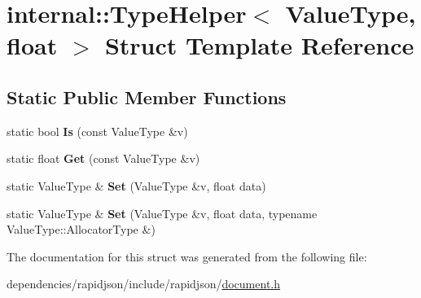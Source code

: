 \hypertarget{structinternal_1_1_type_helper_3_01_value_type_00_01float_01_4}{}\section{internal\+:\+:Type\+Helper$<$ Value\+Type, float $>$ Struct Template Reference}
\label{structinternal_1_1_type_helper_3_01_value_type_00_01float_01_4}
\subsection*{Static Public Member Functions}
\begin{DoxyCompactItemize}
\item 
\mbox{\label{structinternal_1_1_type_helper_3_01_value_type_00_01float_01_4_a1108488a02868bb91c3c14f4598bbebc}} 
static bool {\bfseries Is} (const Value\+Type \&v)
\item 
\mbox{\label{structinternal_1_1_type_helper_3_01_value_type_00_01float_01_4_aa681e0d25878a7a770b0be82322b435a}} 
static float {\bfseries Get} (const Value\+Type \&v)
\item 
\mbox{\label{structinternal_1_1_type_helper_3_01_value_type_00_01float_01_4_a28318c2063421cf18dfa23d16352a3b8}} 
static Value\+Type \& {\bfseries Set} (Value\+Type \&v, float data)
\item 
\mbox{\label{structinternal_1_1_type_helper_3_01_value_type_00_01float_01_4_a3a0d8783f6228504058c427a16687bdf}} 
static Value\+Type \& {\bfseries Set} (Value\+Type \&v, float data, typename Value\+Type\+::\+Allocator\+Type \&)
\end{DoxyCompactItemize}


The documentation for this struct was generated from the following file\+:\begin{DoxyCompactItemize}
\item 
dependencies/rapidjson/include/rapidjson/\hyperlink{document_8h}{document.\+h}\end{DoxyCompactItemize}
